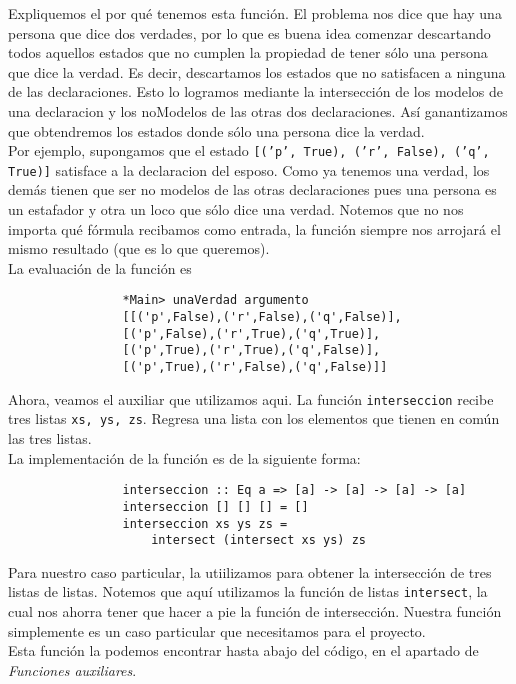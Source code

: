 \documentclass[letterpaper,12pt]{article}
\begin{document}
\begin{itemize}
\begin{itemize}
            Expliquemos el por qué tenemos esta función. El problema nos dice 
            que hay una persona que dice dos verdades, por lo que es buena idea
            comenzar descartando todos aquellos estados que no cumplen la 
            propiedad de tener sólo una persona que dice la verdad. Es decir, 
            descartamos los estados que no satisfacen a ninguna de las 
            declaraciones. Esto lo logramos mediante la intersección de los 
            modelos de una declaracion y los noModelos de las otras dos 
            declaraciones. Así ganantizamos que obtendremos los estados 
            donde sólo una persona dice la verdad. \\
            Por ejemplo, supongamos que el estado 
            \texttt{[('p', True), ('r', False), ('q', True)]} satisface a la
            declaracion del esposo. Como ya tenemos una verdad, los demás 
            tienen que ser no modelos de las otras declaraciones pues una 
            persona es un estafador y otra un loco que sólo dice una verdad.
            Notemos que no nos importa qué fórmula recibamos como entrada, 
            la función siempre nos arrojará el mismo resultado (que es lo que 
            queremos). \\
            La evaluación de la función es
            \begin{lstlisting}
                *Main> unaVerdad argumento
                [[('p',False),('r',False),('q',False)],
                [('p',False),('r',True),('q',True)],
                [('p',True),('r',True),('q',False)],
                [('p',True),('r',False),('q',False)]]
            \end{lstlisting}

            Ahora, veamos el auxiliar que utilizamos aqui. La función 
            \texttt{interseccion} recibe tres listas \texttt{xs, ys, zs}. 
            Regresa una lista con los elementos que tienen en común las tres
            listas. \\
            La implementación de la función es de la siguiente forma:
            \begin{lstlisting}
                interseccion :: Eq a => [a] -> [a] -> [a] -> [a]
                interseccion [] [] [] = [] 
                interseccion xs ys zs = 
                    intersect (intersect xs ys) zs
            \end{lstlisting}

            Para nuestro caso particular, la utiilizamos para obtener la 
            intersección de tres listas de listas. Notemos que aquí 
            utilizamos la función de listas \texttt{intersect}, la cual 
            nos ahorra tener que hacer a pie la función de intersección.
            Nuestra función simplemente es un caso particular que 
            necesitamos para el proyecto. \\
            Esta función la podemos encontrar hasta abajo del código, en el 
            apartado de \textit{Funciones auxiliares}.
        \end{itemize}


\end{itemize}
\end{document}

